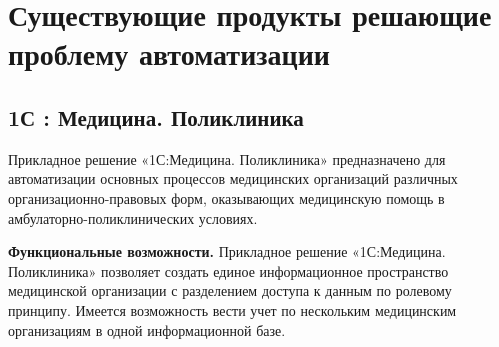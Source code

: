\documentclass[14pt,a4paper,russian]{extreport}
\begin{document}
\newpage
\section{Существующие продукты решающие проблему автоматизации}

\subsection{1С : Медицина. Поликлиника}
Прикладное решение «1С:Медицина. Поликлиника» предназначено для автоматизации основных процессов
медицинских организаций различных организационно-правовых форм, оказывающих медицинскую помощь в
амбулаторно-поликлинических условиях. 

\textbf{Функциональные возможности.} 
Прикладное решение «1С:Медицина. Поликлиника» позволяет создать единое информационное пространство
медицинской организации с разделением доступа к данным по ролевому принципу. Имеется возможность
вести учет по нескольким медицинским организациям в одной информационной базе.
\end{document}
